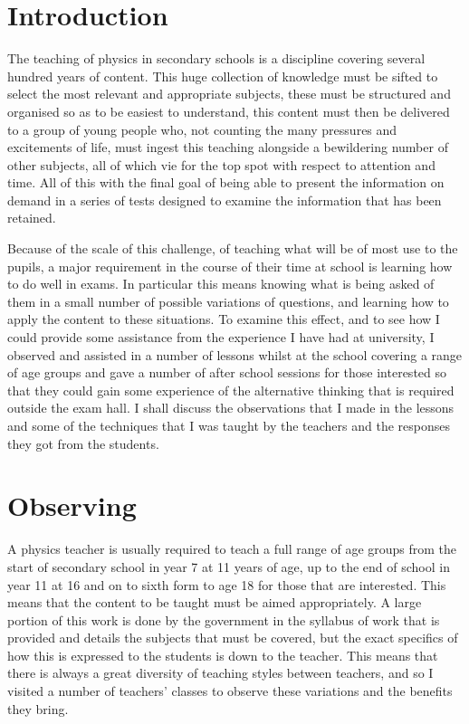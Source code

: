 
\section{Introduction} %
\label{sec:introduction}
	The teaching of physics in secondary schools is a discipline covering several hundred years of content. This huge collection of knowledge must be sifted to select the most relevant and appropriate subjects, these must be structured and organised so as to be easiest to understand, this content must then be delivered to a group of young people who, not counting the many pressures and excitements of life, must ingest this teaching alongside a bewildering number of other subjects, all of which vie for the top spot with respect to attention and time. All of this with the final goal of being able to present the information on demand in a series of tests designed to examine the information that has been retained.

	Because of the scale of this challenge, of teaching what will be of most use to the pupils, a major requirement in the course of their time at school is learning how to do well in exams. In particular this means knowing what is being asked of them in a small number of possible variations of questions, and learning how to apply the content to these situations. To examine this effect, and to see how I could provide some assistance from the experience I have had at university, I observed and assisted in a number of lessons whilst at the school covering a range of age groups and gave a number of after school sessions for those interested so that they could gain some experience of the alternative thinking that is required outside the exam hall. I shall discuss the observations that I made in the lessons and some of the techniques that I was taught by the teachers and the responses they got from the students.

\section{Observing} %
\label{sec:observing}
	A physics teacher is usually required to teach a full range of age groups from the start of secondary school in year 7 at 11 years of age, up to the end of school in year 11 at 16 and on to sixth form to age 18 for those that are interested. This means that the content to be taught must be aimed appropriately. A large portion of this work is done by the government in the syllabus of work that is provided and details the subjects that must be covered, but the exact specifics of how this is expressed to the students is down to the teacher. This means that there is always a great diversity of teaching styles between teachers, and so I visited a number of teachers' classes to observe these variations and the benefits they bring.


